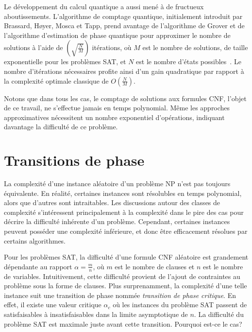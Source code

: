 Le développement du calcul quantique a aussi mené à de fructueux aboutissements. L'algorithme de comptage quantique, initialement introduit par Brassard, H\o yer, Mosca et Tapp, prend avantage de l'algorithme de Grover et de l'algorithme d'estimation de phase quantique pour approximer le nombre de solutions à l'aide de $(\sqrt{\frac{N}{M}})$ itérations, où $M$ est le nombre de solutions, de taille exponentielle pour les problèmes SAT, et $N$ est le nombre d'états possibles~\cite{brassardQuantumAmplitudeAmplification2002, wieSimplerQuantumCounting2019, aaronsonQuantumApproximateCounting2020}. Le nombre d'itérations nécessaires profite ainsi d'un gain quadratique par rapport à la complexité optimale classique de $O(\frac{N}{M})$.

Notons que dans tous les cas, le comptage de solutions aux formules CNF, l'objet de ce travail, ne s'effectue jamais en temps polynomial. Même les approches approximatives nécessitent un nombre exponentiel d'opérations, indiquant davantage la difficulté de ce problème.


\section{Transitions de phase}
\label{sec:transitions-de-phase}

La complexité d'une instance aléatoire d'un problème \textsf{NP} n'est pas toujours équivalente. En réalité, certaines instances sont résolubles en temps polynomial, alors que d'autres sont intraitables. Les discussions autour des classes de complexité s'intéressent principalement à la complexité dans le pire des cas pour décrire la difficulté inhérente d'un problème. Cependant, certaines instances peuvent posséder une complexité inférieure, et donc être efficacement résolues par certains algorithmes. 

Pour les problèmes SAT, la difficulté d'une formule CNF aléatoire est grandement dépendante au rapport $\alpha = \frac{m}{n}$, où $m$ est le nombre de clauses et $n$ est le nombre de variables. Intuitivement, cette difficulté provient de l'ajout de contraintes au problème sous la forme de clauses. Plus surprenamment, la complexité d'une telle instance suit une transition de phase nommée \textit{transition de phase critique}. En effet, il existe une valeur critique $\alpha_{c}$ où les instances du problème SAT passent de satisfaisables à insatisfaisables dans la limite asymptotique de $n$. La difficulté du problème SAT est maximale juste avant cette transition. Pourquoi est-ce le cas?

